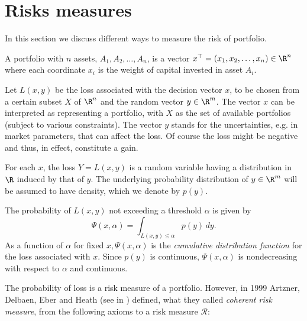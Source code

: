 \section{Risks measures}

In this section we discuss different ways to measure the risk of portfolio.


\begin{definition}
	A portfolio with $n$ assets, $A_1, A_2, \dots, A_n$, is a vector $x^\top = (x_1, x_2, \dots, x_n)\in \R^n$ where each coordinate $x_i$ is the weight of capital invested in asset $A_i$.
\end{definition}

Let $L(x,y)$ be the loss associated with the decision vector $x$, to be chosen from a certain subset $X$ of $\R^n$ and the random vector $y \in \R^m$. The vector $x$ can be interpreted as representing a portfolio, with $X$ as the set of available portfolios
(subject to various constraints). The vector $y$ stands for the uncertainties, e.g. in market parameters, that can affect the loss. Of course the loss might be negative and thus, in effect, constitute a gain.

For each $x$, the loss $Y=L(x,y)$ is a random variable having a distribution in $\R$ induced by that of $y$. The underlying probability distribution of $y \in \R^m$ will be assumed to have density, which we denote by $p(y)$.

The probability of $L(x,y)$ not exceeding a threshold $\alpha$ is given by
\[
	\Psi (x,\alpha) = \int_{L(x,y)\leq \alpha} p(y)\,dy.
\]
As a function of $\alpha$ for fixed $x, \Psi(x, \alpha)$ is the \textit{cumulative distribution function} for the loss associated with $x$. Since $p(y)$ is continuous, $\Psi(x, \alpha)$ is nondecreasing with respect to $\alpha$ and continuous.




The probability of loss is a risk measure of a portfolio. However, in 1999 Artzner, Delbaen, Eber and Heath (see in \cite{Artzner1999}) defined, what they called \textit{coherent risk measure}, from the following axioms to a risk measure $\mathcal{R}$:


